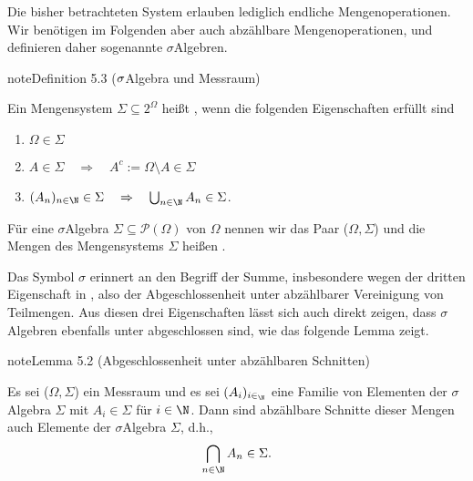 \documentclass[letterpaper,10pt,german]{jupyterBook}
\begin{document}
\sphinxAtStartPar
Die bisher betrachteten System erlauben lediglich endliche Mengenoperationen. Wir benötigen im Folgenden aber auch abzählbare Mengenoperationen, und definieren daher sogenannte \(\sigma\)\sphinxhyphen{}Algebren.
\label{masstheorie/masstheorie:def:sigmaalgebra}
\begin{sphinxadmonition}{note}{Definition 5.3 (\protect\(\sigma\protect\)\sphinxhyphen{}Algebra und Messraum)}



\sphinxAtStartPar
Ein Mengensystem \(\Sigma \subseteq 2^\Omega\) heißt , wenn die folgenden Eigenschaften erfüllt sind
\begin{enumerate}
%
\item {} 
\sphinxAtStartPar
\(\Omega\in \Sigma\)

\item {} 
\sphinxAtStartPar
\(A\in \Sigma \quad \Rightarrow \quad A^c:=\Omega \setminus A\in \Sigma\)

\item {} 
\sphinxAtStartPar
\((A_n)_{n\in\N} \in \Sigma \quad \Rightarrow \quad \bigcup_{n\in \N} A_n\in \Sigma\).

\end{enumerate}

\sphinxAtStartPar
Für eine \(\sigma\)\sphinxhyphen{}Algebra \(\Sigma \subseteq \mathcal{P}(\Omega)\) von \(\Omega\) nennen wir das Paar (\(\Omega,\Sigma\))  und die Mengen des Mengensystems \(\Sigma\) heißen .
\end{sphinxadmonition}

\sphinxAtStartPar
Das Symbol \(\sigma\) erinnert an den Begriff der Summe, insbesondere wegen der dritten Eigenschaft in {\hyperref[\detokenize{masstheorie/masstheorie:def:sigmaalgebra}]{}}, also der Abgeschlossenheit unter abzählbarer Vereinigung von Teilmengen.
Aus diesen drei Eigenschaften lässt sich auch direkt zeigen, dass \(\sigma\)\sphinxhyphen{}Algebren ebenfalls unter  abgeschlossen sind, wie das folgende Lemma zeigt.
\label{masstheorie/masstheorie:lemma-6}
\begin{sphinxadmonition}{note}{Lemma 5.2 (Abgeschlossenheit unter abzählbaren Schnitten)}



\sphinxAtStartPar
Es sei (\(\Omega,\Sigma\)) ein Messraum und es sei \((A_i)_{i\in_\N}\) eine Familie von Elementen der \(\sigma\)\sphinxhyphen{}Algebra \(\Sigma\) mit \(A_i \in \Sigma\) für \(i \in \N\).
Dann sind abzählbare Schnitte dieser Mengen auch Elemente der \(\sigma\)\sphinxhyphen{}Algebra \(\Sigma\), d.h.,
\begin{equation*}
\begin{split}\bigcap_{n \in \N} A_n \in \Sigma.\end{split}
\end{equation*}\end{sphinxadmonition}
\end{document}
